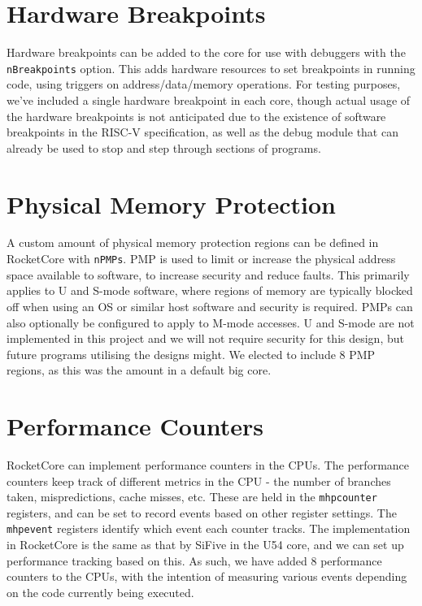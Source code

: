\section{Hardware Breakpoints}
Hardware breakpoints can be added to the core for use with debuggers with the \texttt{nBreakpoints} option. This adds hardware resources to set breakpoints in running code, using triggers on address/data/memory operations. For testing purposes, we've included a single hardware breakpoint in each core, though actual usage of the hardware breakpoints is not anticipated due to the existence of software breakpoints in the RISC-V specification, as well as the debug module that can already be used to stop and step through sections of programs.

\section{Physical Memory Protection}
A custom amount of physical memory protection regions can be defined in RocketCore with \texttt{nPMPs}. PMP is used to limit or increase the physical address space available to software, to increase security and reduce faults. This primarily applies to U and S-mode software, where regions of memory are typically blocked off when using an OS or similar host software and security is required. PMPs can also optionally be configured to apply to M-mode accesses. U and S-mode are not implemented in this project and we will not require security for this design, but future programs utilising the designs might. We elected to include 8 PMP regions, as this was the amount in a default big core.

\section{Performance Counters}
RocketCore can implement performance counters in the CPUs. The performance counters keep track of different metrics in the CPU - the number of branches taken, mispredictions, cache misses, etc. These are held in the \texttt{mhpcounter} registers, and can be set to record events based on other register settings. The \texttt{mhpevent} registers identify which event each counter tracks. The implementation in RocketCore is the same as that by SiFive in the U54 core\cite{u54}, and we can set up performance tracking based on this. As such, we have added 8 performance counters to the CPUs, with the intention of measuring various events depending on the code currently being executed.

